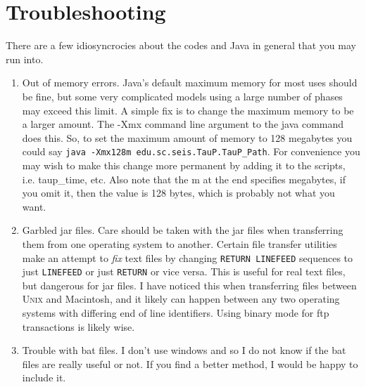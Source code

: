 
\section{Troubleshooting}

There are a few idiosyncrocies about the codes and Java in general that you may
run into.

\begin{enumerate}

\item Out of memory errors. Java's default maximum memory for most uses should be fine,
 but some very complicated
models using a large number of phases may exceed this limit. A simple fix is
to change the maximum memory to be a larger amount. The -Xmx command line argument
to the java command does this. So, to set the maximum amount of memory to
128 megabytes you could say \texttt{java -Xmx128m edu.sc.seis.TauP.TauP\_Path}.
For convenience you may wish to make this change more permanent by adding it
to the scripts, i.e. taup\_time, etc. Also note that the m at the end specifies megabytes, if you 
omit it, then the value is 128 bytes, which is probably not what you want.

\item Garbled jar files. Care should be taken with the jar files when
transferring them
from one operating system to another. Certain file transfer utilities
make an attempt
to \textit{fix} text files by changing \texttt{RETURN LINEFEED} sequences to
just \texttt{LINEFEED} or just \texttt{RETURN} or vice versa. This is useful for
real text files, but dangerous for jar files. I have noticed this when
transferring
files between \textsc{Unix} and Macintosh, and it likely can happen
between any two
operating systems with differing end of line identifiers. Using binary mode for
ftp transactions is likely wise.

\item Trouble with bat files. I don't use windows and so I do not know if the
bat files are really useful or not. If you find a better method, I would be
happy to include it.
\end{enumerate}
